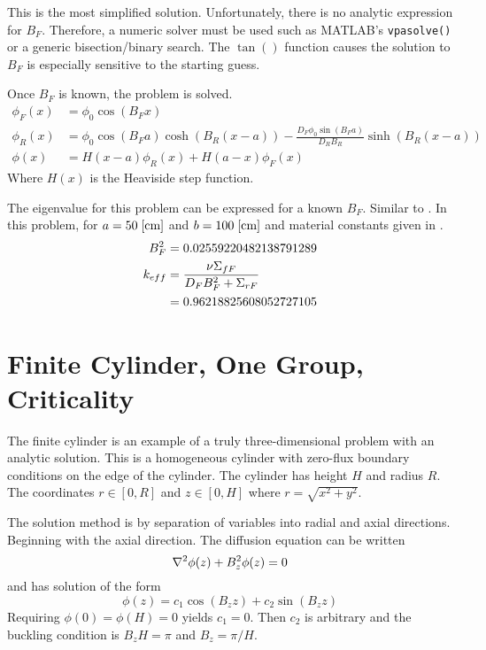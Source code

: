   This is the most simplified solution. Unfortunately, there is no analytic
  expression for $B_F$. Therefore, a numeric solver must be used such as 
  MATLAB's \verb|vpasolve()| or a generic bisection/binary search. The $\tan()$ 
  function causes the solution to $B_F$ is especially sensitive to the starting
  guess.
  
  Once $B_F$ is known, the problem is solved.
  \begin{align}
    \phi_F(x) &= \phi_0 \cos(B_F x)\\
    \phi_R(x) &= \phi_0 \cos(B_F a) \cosh(B_R (x-a)) 
      - \frac{D_F \phi_0 \sin(B_F a)}{D_R B_R} \sinh(B_R (x-a))\\
    \phi(x) &= H(x-a)\phi_R(x) + H(a-x)\phi_F(x)
  \end{align}
  Where $H(x)$ is the Heaviside step function.  
  
  The eigenvalue for this problem can be expressed for a known $B_F$. Similar 
  to . In this problem, for $a=50 \;\text{[{cm}]}$ and
  $b=100 \;\text{[{cm}]}$ and material constants given in .
  \begin{align}
    B_F^2  &= 0.02559220482138791289 \\
    k_{eff} &= \frac{\nu\Sigma_{fF}}{D_F B_F^2 + \Sigma_{rF}} \\
    &= 0.96218825608052727105
  \end{align}
  
\section{Finite Cylinder, One Group, Criticality}
  The finite cylinder is an example of a truly three-dimensional problem with
  an analytic solution. This is a homogeneous cylinder with zero-flux boundary
  conditions on the edge of the cylinder. The cylinder has height $H$ and 
  radius $R$. The coordinates $r\in[0,R]$ and $z\in[0,H]$ where 
  $r=\sqrt{x^2+y^2}$.
  
  The solution method is by separation of variables into radial and axial 
  directions. Beginning with the axial direction. The diffusion equation can 
  be written
  \begin{equation} \label{eq:simplediffusion}
    \mathbf{\nabla}^2 \phi(z) + B_z^2 \phi(z) = 0
  \end{equation}
  and has solution of the form
  \begin{equation} \label{eq:cyl_axial}
    \phi(z) = c_1 \cos(B_z z) + c_2 \sin(B_z z)
  \end{equation}
  Requiring $\phi(0)=\phi(H)=0$ yields $c_1=0$. Then $c_2$ is arbitrary and 
  the buckling condition is $B_zH=\pi$ and $B_z=\pi/H$.
  
